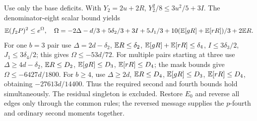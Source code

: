 Use only the base deficits. With $Y_2=2u+2R$,
$Y_2^2/8\le3u^2/5+3I$. The denominator-eight scalar bound yields
\begin{equation}\label{eq:compact-min2-second}
 \mathbb E(f_2P)^2\le e^\Omega,\quad
 \Omega=-2\Delta-d/3+5\delta_{2}/3+3I+5J_1/3
               +10(\mathbb E[gR]+\mathbb E[rR])/3+2\mathbb E R.
\end{equation}
For one $b=3$ pair use $\Delta=2d-\delta_{2}$, $\mathbb E R\le \delta_{2}$,
$\mathbb E[gR]+\mathbb E[rR]\le \delta_{4}$, $I\le3\delta_{3}/2$, $J_1\le3\delta_{4}/2$;
this gives $\Omega\le-53d/72$.
For multiple pairs starting at three use $\Delta\ge4d-\delta_{2}$,
$\mathbb E R\le D_2$, $\mathbb E[gR]\le D_3$, $\mathbb E[rR]\le D_4$;
the mask bounds give $\Omega\le-6427d/1800$.
For $b\ge4$, use $\Delta\ge2d$, $\mathbb E R\le D_4$,
$\mathbb E[gR]\le D_3$, $\mathbb E[rR]\le D_4$, obtaining $-27613d/14400$.
Thus the required second and fourth bounds hold simultaneously.
The residual singleton is excluded. Restore $E_0$ and reverse all edges
only through the common rules; the reversed message supplies the
$p$-fourth and ordinary second moments together.

